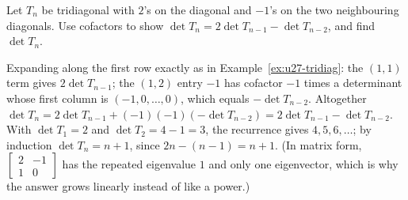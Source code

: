 \begin{exercise}\label{exr:u27-tridiag2}
Let $T_n$ be tridiagonal with $2$'s on the diagonal and $-1$'s on the two neighbouring
diagonals. Use cofactors to show $\det T_n=2\det T_{n-1}-\det T_{n-2}$, and find $\det T_n$.
\end{exercise}
\begin{solution}
Expanding along the first row exactly as in Example~\ref{ex:u27-tridiag}: the $(1,1)$ term
gives $2\det T_{n-1}$; the $(1,2)$ entry $-1$ has cofactor $-1$ times a determinant whose
first column is $(-1,0,\dots,0)$, which equals $-\det T_{n-2}$. Altogether
$\det T_n=2\det T_{n-1}+(-1)(-1)(-\det T_{n-2})=2\det T_{n-1}-\det T_{n-2}$. With
$\det T_1=2$ and $\det T_2=4-1=3$, the recurrence gives $4,5,6,\dots$; by induction
$\det T_n=n+1$, since $2n-(n-1)=n+1$. (In matrix form, $\left[\begin{smallmatrix} 2&-1\\ 1&0\end{smallmatrix}\right]$
has the repeated eigenvalue $1$ and only one eigenvector, which is why the answer grows
linearly instead of like a power.)
\end{solution}
